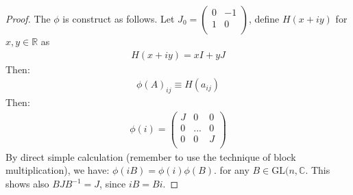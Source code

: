 \documentclass{article}
\numberwithin{equation}{subsection} %
\theoremstyle{definition}
\begin{document}
        \begin{proof}
            The $\phi$ is construct as follows. Let 
            $J_0=\left( \begin{array}{cc}
                 0 & -1 \\
            1 & 0 \\ \end{array} \right)$, define $H(x+iy)$ for
            $x,y\in \mathbb{R}$ as
            \begin{align}
                H(x+iy) = x I + y J
            \end{align}
            Then:
            \begin{align}
                \phi(A)_{ij} \equiv H(a_{ij})
            \end{align}
            Then:
            \begin{align}
                \phi(i) = \left( \begin{array}{ccc}
                     J & 0 & 0 \\
                     0 & \text{...} & 0 \\
                     0 & 0 & J \\
                    \end{array} \right)
            \end{align}
            By direct simple calculation (remember to use the technique
            of block multiplication), we have:
            $\phi(i B)= \phi(i)\phi(B)$.
            for any $B\in \mathrm{GL}(n,\mathbb{C}$. This shows also
            $BJB^{-1}=J$, since $iB=Bi$.
            

\end{proof}
\end{document}
